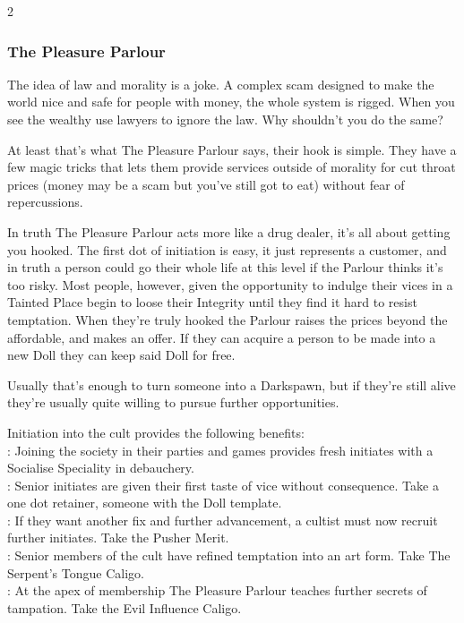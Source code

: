 \begin{multicols}{2}
\subsubsection*{The Pleasure Parlour}

The idea of law and morality is a joke. A complex scam designed to make the world nice and safe for people with money, the whole system is rigged. When you see the wealthy use lawyers to ignore the law. Why shouldn't you do the same? 

At least that's what The Pleasure Parlour says, their hook is simple. They have a few magic tricks that lets them provide services outside of morality for cut throat prices (money may be a scam but you've still got to eat) without fear of repercussions. 

In truth The Pleasure Parlour acts more like a drug dealer, it's all about getting you hooked. The first dot of initiation is easy, it just represents a customer, and in truth a person could go their whole life at this level if the Parlour thinks it's too risky. Most people, however, given the opportunity to indulge their vices in a Tainted Place begin to loose their Integrity until they find it hard to resist temptation. When they're truly hooked the Parlour raises the prices beyond the affordable, and makes an offer. If they can acquire a person to be made into a new Doll they can keep said Doll for free. 

Usually that's enough to turn someone into a Darkspawn, but if they're still alive they're usually quite willing to pursue further opportunities. 

Initiation into the cult provides the following benefits: \\

\noindent \textbullet: Joining the society in their parties and games provides fresh initiates with a Socialise Speciality in debauchery.\\
\noindent \textbullet\textbullet: Senior initiates are given their first taste of vice without consequence. Take a one dot retainer, someone with the Doll template.\\
\noindent \textbullet\textbullet\textbullet: If they want another fix and further advancement, a cultist must now recruit further initiates. Take the Pusher Merit. \\
\noindent \textbullet\textbullet\textbullet\textbullet: Senior members of the cult have refined temptation into an art form. Take The Serpent's Tongue Caligo. \\
\noindent \textbullet\textbullet\textbullet\textbullet\textbullet: At the apex of membership The Pleasure Parlour teaches further secrets of tampation. Take the Evil Influence Caligo. 


\end{multicols}
